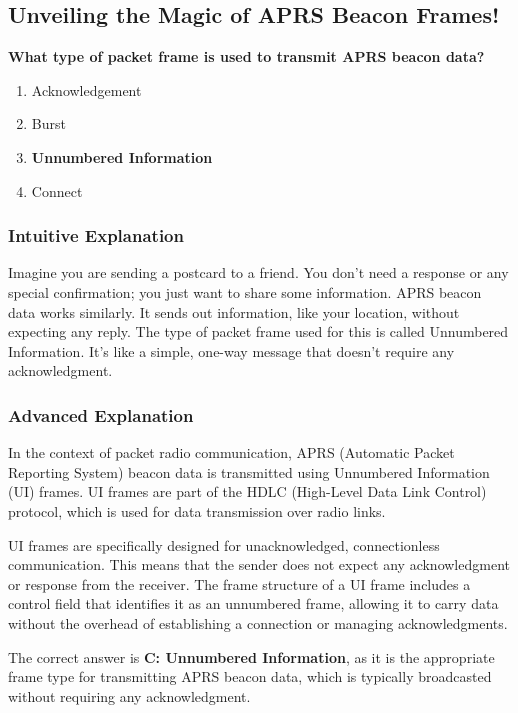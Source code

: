 \subsection{Unveiling the Magic of APRS Beacon Frames!}

\begin{tcolorbox}[colback=gray!10!white,colframe=black!75!black,title=\textbf{E2D08}]
\textbf{What type of packet frame is used to transmit APRS beacon data?}
\begin{enumerate}[label=\Alph*.]
    \item Acknowledgement
    \item Burst
    \item \textbf{Unnumbered Information}
    \item Connect
\end{enumerate}
\end{tcolorbox}

\subsubsection{Intuitive Explanation}
Imagine you are sending a postcard to a friend. You don't need a response or any special confirmation; you just want to share some information. APRS beacon data works similarly. It sends out information, like your location, without expecting any reply. The type of packet frame used for this is called Unnumbered Information. It's like a simple, one-way message that doesn't require any acknowledgment.

\subsubsection{Advanced Explanation}
In the context of packet radio communication, APRS (Automatic Packet Reporting System) beacon data is transmitted using Unnumbered Information (UI) frames. UI frames are part of the HDLC (High-Level Data Link Control) protocol, which is used for data transmission over radio links. 

UI frames are specifically designed for unacknowledged, connectionless communication. This means that the sender does not expect any acknowledgment or response from the receiver. The frame structure of a UI frame includes a control field that identifies it as an unnumbered frame, allowing it to carry data without the overhead of establishing a connection or managing acknowledgments.

The correct answer is \textbf{C: Unnumbered Information}, as it is the appropriate frame type for transmitting APRS beacon data, which is typically broadcasted without requiring any acknowledgment.

